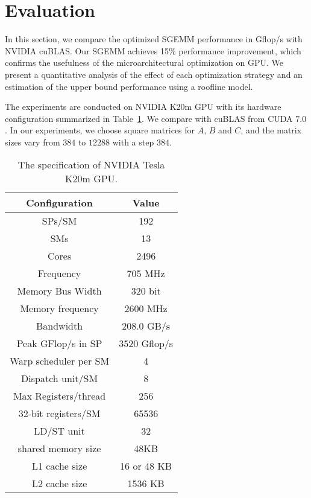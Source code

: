 \section{Evaluation}
\label{sec:experiment}


In this section, we compare the optimized SGEMM performance in Gflop/s with NVIDIA cuBLAS. 
Our SGEMM achieves 15\% %
performance
improvement, which confirms the usefulness of the microarchitectural optimization on GPU. 
We present 
a quantitative analysis of the effect of each optimization strategy and an estimation of the upper bound performance using a roofline model.

The experiments are conducted on NVIDIA K20m GPU with its hardware configuration summarized in 
Table~\ref{table:k20}. We compare with cuBLAS from CUDA $7.0$. In our experiments, we choose square matrices for $A$, $B$
and $C$, and  the matrix sizes vary from $384$ to $12288$ with a step $384$.

\begin{table}[htbp]
\caption{The specification of NVIDIA Tesla K20m GPU.}
\centering
\scalebox{0.8} {
\begin{tabular}{|c|c|}
\hline
Configuration& Value\\
\hline
SPs/SM &192\\
\hline
SMs&13\\
\hline
Cores &2496\\
\hline
Frequency&705 MHz\\
\hline
Memory Bus Width&320 bit \\
\hline
Memory frequency&2600 MHz\\
\hline
Bandwidth&208.0 GB/s\\
\hline
Peak GFlop/s in SP&3520 Gflop/s\\
\hline
Warp scheduler per SM&4\\
\hline
Dispatch unit/SM&8\\
\hline
Max Registers/thread&256 \\
\hline
    32-bit registers/SM&65536 \\ %
\hline
LD/ST unit&32 \\
\hline
shared memory size&48KB\\
\hline
L1 cache size&16 or 48 KB\\
\hline
L2 cache size&1536 KB\\
\hline
\end{tabular}
}
\label{table:k20}
\end{table}



